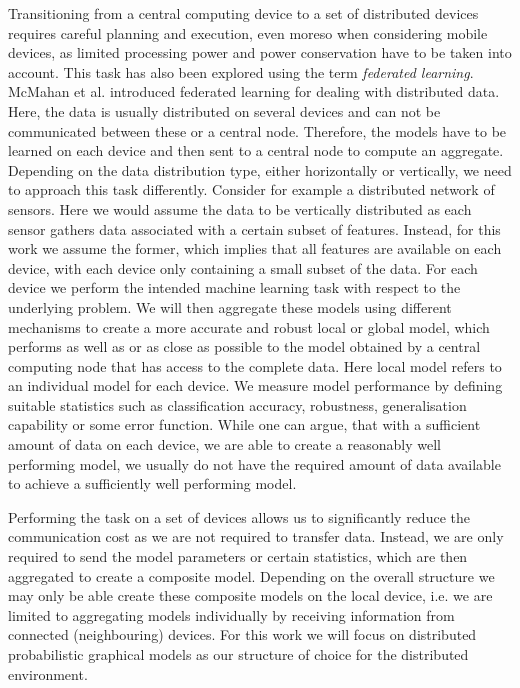 Transitioning from a central computing device to a set of distributed devices requires careful planning and execution, even moreso when considering mobile devices, as limited processing power and power conservation have to be taken into account.
This task has also been explored using the term \textit{federated learning}.
McMahan et al. \cite{mcmahan2016communication} introduced federated learning for dealing with distributed data.
Here, the data is usually distributed on several devices and can not be communicated between these or a central node. 
Therefore, the models have to be learned on each device and then sent to a central node to compute an aggregate.
Depending on the data distribution type, either horizontally or vertically, we need to approach this task differently. 
Consider for example a distributed network of sensors.
Here we would assume the data to be vertically distributed as each sensor gathers data associated with a certain subset of features.
Instead, for this work we assume the former, which implies that all features are available on each device, with each device only containing a small subset of the data.
For each device we perform the intended machine learning task with respect to the underlying problem.
We will then aggregate these models using different mechanisms to create a more accurate and robust local or global model, which performs as well as or as close as possible to the model obtained by a central computing node that has access to the complete data.
Here local model refers to an individual model for each device.
We measure model performance by defining suitable statistics such as classification accuracy, robustness, generalisation capability or some error function.
While one can argue, that with a sufficient amount of data on each device, we are able to create a reasonably well performing model, we usually do not have the required amount of data available to achieve a sufficiently well performing model.

Performing the task on a set of devices allows us to significantly reduce the communication cost as we are not required to transfer data.
Instead, we are only required to send the model parameters or certain statistics, which are then aggregated to create a composite model.
Depending on the overall structure we may only be able create these composite models on the local device, i.e. we are limited to aggregating models individually by receiving information from connected (neighbouring) devices.
For this work we will focus on distributed probabilistic graphical models as our structure of choice for the distributed environment.
